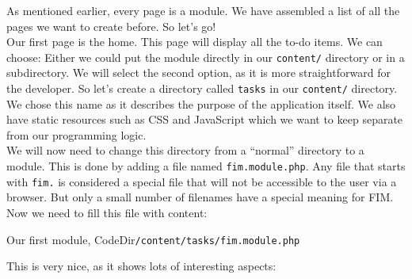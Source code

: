 \documentclass{scrartcl}
\begin{document}
      As mentioned earlier, every page is a module. We have assembled a list of all the pages we want to create before. So let's go! \\
      Our first page is the home. This page will display all the to-do items. We can choose: Either we could put the module directly in our \texttt{content/} directory or in a subdirectory. We will select the second option, as it is more straightforward for the developer. So let's create a directory called \texttt{tasks} in our \texttt{content/} directory. We chose this name as it describes the purpose of the application itself. We also have static resources such as CSS and JavaScript which we want to keep separate from our programming logic. \\
      We will now need to change this directory from a ``normal'' directory to a module. This is done by adding a file named \texttt{fim.module.php}. Any file that starts with \texttt{fim.} is considered a special file that will not be accessible to the user via a browser. But only a small number of filenames have a special meaning for FIM. Now we need to fill this file with content:
      \begin{listing}[H]
         \caption{Our first module, CodeDir\texttt{/content/tasks/fim.module.php}}
      \end{listing}
      This is very nice, as it shows lots of interesting aspects:
\end{document}
